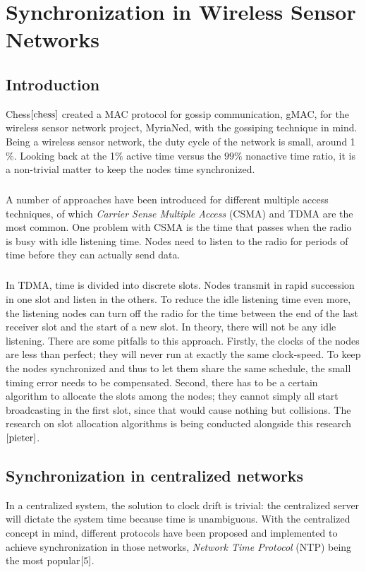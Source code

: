 \documentclass[a4paper,10pt]{report}
\begin{document}
\chapter{\textbf{Synchronization in Wireless Sensor Networks}}
\section{\textbf{Introduction}}
Chess$\cite{chess}$ created a MAC protocol for gossip communication, gMAC, for the wireless sensor network project, MyriaNed, with the gossiping technique in mind. Being a wireless sensor network, the duty cycle of the network is small, around 1$\%$. Looking back at the 1$\%$ active time versus the $99\%$ nonactive time ratio, it is a non-trivial matter to keep the nodes time synchronized.
\paragraph*{}
A number of approaches have been introduced for different multiple access techniques, of which \textit{Carrier Sense Multiple Access} (CSMA) and TDMA are the most common. One problem with CSMA is the time that passes when the radio is busy with idle listening time. Nodes need to listen to the radio for periods of time before they can actually send data.
\paragraph*{}
In TDMA, time is divided into discrete slots. Nodes transmit in rapid succession in one slot and listen in the others. To
reduce the idle listening time even more, the listening nodes can turn off the radio for the time between the end of the last receiver slot
and the start of a new slot. In theory, there will not be any idle listening. There are some pitfalls to this approach. Firstly, the
clocks of the nodes are less than perfect; they will never run at exactly the same clock-speed. To keep the nodes synchronized and
thus to let them share the same schedule, the small timing error needs to be compensated. Second, there has to be a certain algorithm
to allocate the slots among the nodes; they cannot simply all start broadcasting in the first slot, since that would cause nothing but
collisions. The research on slot allocation algorithms is being conducted alongside this research$\cite{pieter}$.
\section{\textbf{Synchronization in centralized networks}}
In a centralized system, the solution to clock drift is trivial: the centralized server will dictate the system time because time is unambiguous. With the centralized concept in mind, different protocols have been proposed and implemented to achieve synchronization in those networks, \textit{Network Time Protocol} (NTP) being the most popular$\cite{5}$.
\end{document}
